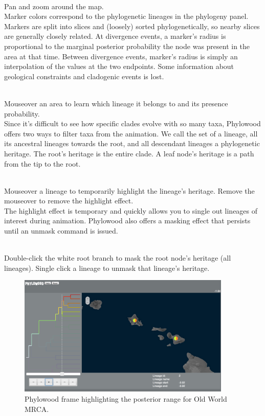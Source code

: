 \noindent \\ \impmark Pan and zoom around the map.\\

Marker colors correspond to the phylogenetic lineages in the phylogeny panel.
Markers are split into slices and (loosely) sorted phylogenetically, so nearby slices are generally closely related.
At divergence events, a marker's radius is proportional to the marginal posterior probability the node was present in the area at that time.
Between divergence events, marker's radius is simply an interpolation of the values at the two endpoints.
Some information about geological constraints and cladogenic events is lost.

\noindent \\ \impmark Mouseover an area to learn which lineage it belongs to and its presence probability. \\

Since it's difficult to see how specific clades evolve with so many taxa, Phylowood offers two ways to filter taxa from the animation.
We call the set of a lineage, all its ancestral lineages towards the root, and all descendant lineages a phylogenetic heritage.
The root's heritage is the entire clade.
A leaf node's heritage is a path from the tip to the root.

\noindent \\ \impmark Mouseover a lineage to temporarily highlight the lineage's heritage. Remove the mouseover to remove the highlight effect. \\

The highlight effect is temporary and quickly allows you to single out lineages of interest during animation.
Phylowood also offers a masking effect that persists until an unmask command is issued.

\noindent \\ \impmark Double-click the white root branch to mask the root node's heritage (all lineages). Single click a lineage to unmask that lineage's heritage. \\

\begin{figure}[H]
\centering
\includegraphics[width=4in]{figures/phw_br23}
\caption{Phylowood frame highlighting the posterior range for Old World MRCA.}
\end{figure}

